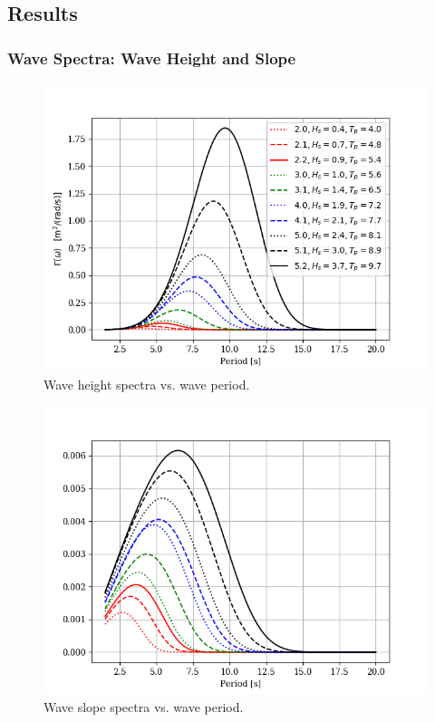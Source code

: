 \documentclass[11pt, letterpaper]{article}
\begin{document}
\subsection{Results}
\newcommand{\RFW}{0.7}

\subsubsection{Wave Spectra: Wave Height and Slope}

\begin{figure}[hbt!]
\centering
\includegraphics[width=\RFW\linewidth]{cusv/SvsT.png}
\caption{Wave height spectra vs. wave period.}
\label{f:SvsT}
\end{figure}

\begin{figure}[hbt!]
\centering
\includegraphics[width=\RFW\linewidth]{cusv/slopeVt.png}
\caption{Wave slope spectra vs. wave period.}
\label{f:slopeVt}
\end{figure}
\end{document}
